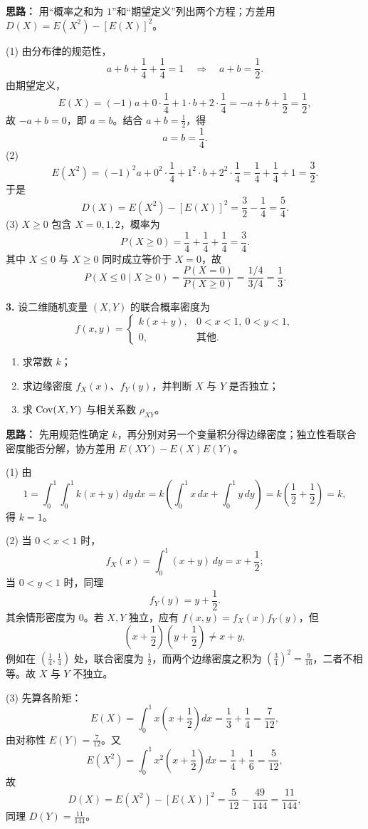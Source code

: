 \ifshowsolutions%
\textbf{思路：} 用“概率之和为 $1$”和“期望定义”列出两个方程；方差用 $D(X)=E(X^2)-[E(X)]^2$。

(1) 由分布律的规范性，
\[
a+b+\frac14+\frac14=1\quad\Longrightarrow\quad a+b=\frac12.
\]
由期望定义，
\[
E(X)=(-1)a+0\cdot\frac14+1\cdot b+2\cdot\frac14
=-a+b+\frac12=\frac12,
\]
故 $-a+b=0$，即 $a=b$。结合 $a+b=\frac12$，得
\[
a=b=\frac14.
\]
(2)
\[
E(X^2)=(-1)^2a+0^2\cdot\frac14+1^2\cdot b+2^2\cdot\frac14
=\frac14+\frac14+1=\frac32.
\]
于是
\[
D(X)=E(X^2)-[E(X)]^2=\frac32-\frac14=\frac54.
\]
(3) $X\geq0$ 包含 $X=0,1,2$，概率为
\[
P(X\geq0)=\frac14+\frac14+\frac14=\frac34.
\]
其中 $X\leq0$ 与 $X\geq0$ 同时成立等价于 $X=0$，故
\[
P(X\leq0\mid X\geq0)=\frac{P(X=0)}{P(X\geq0)}
=\frac{1/4}{3/4}=\frac13.
\]

\else \answerarea[8] \fi%

\textbf{3.} 设二维随机变量 $(X,Y)$ 的联合概率密度为
\[
f(x,y)=\begin{cases}
k(x+y), & 0<x<1,\ 0<y<1,\\
0, & \text{其他}.
\end{cases}
\]
\begin{enumerate}
    \item[(1)] 求常数 $k$；
    \item[(2)] 求边缘密度 $f_X(x)$、$f_Y(y)$，并判断 $X$ 与 $Y$ 是否独立；
    \item[(3)] 求 $\operatorname{Cov}(X,Y)$ 与相关系数 $\rho_{XY}$。
\end{enumerate}

\ifshowsolutions%
\textbf{思路：} 先用规范性确定 $k$，再分别对另一个变量积分得边缘密度；独立性看联合密度能否分解，协方差用 $E(XY)-E(X)E(Y)$。

(1) 由
\[
1=\int_0^1\int_0^1 k(x+y)\,dy\,dx
=k\left(\int_0^1x\,dx+\int_0^1y\,dy\right)
=k\left(\frac12+\frac12\right)=k,
\]
得 $k=1$。

(2) 当 $0<x<1$ 时，
\[
f_X(x)=\int_0^1(x+y)\,dy=x+\frac12;
\]
当 $0<y<1$ 时，同理
\[
f_Y(y)=y+\frac12.
\]
其余情形密度为 $0$。若 $X,Y$ 独立，应有 $f(x,y)=f_X(x)f_Y(y)$，但
\[
\left(x+\frac12\right)\left(y+\frac12\right)\neq x+y,
\]
例如在 $\left(\frac14,\frac14\right)$ 处，联合密度为 $\frac12$，而两个边缘密度之积为 $\left(\frac34\right)^2=\frac{9}{16}$，二者不相等。故 $X$ 与 $Y$ 不独立。

(3) 先算各阶矩：
\[
E(X)=\int_0^1x\left(x+\frac12\right)dx
=\frac13+\frac14=\frac7{12},
\]
由对称性 $E(Y)=\frac7{12}$。又
\[
E(X^2)=\int_0^1x^2\left(x+\frac12\right)dx
=\frac14+\frac16=\frac5{12},
\]
故
\[
D(X)=E(X^2)-[E(X)]^2=\frac5{12}-\frac{49}{144}=\frac{11}{144},
\]
同理 $D(Y)=\frac{11}{144}$。

